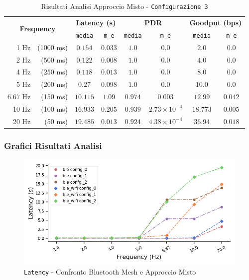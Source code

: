 \begin{table}[hbt!]
    \centering
    \begin{tabular}{ |rr|| c|c|c|c|c|c| } 
        \hline
        \multicolumn{2}{|c||}{\multirow{2}{*}{\textbf{Frequency}}} & \multicolumn{2}{|c|}{\textbf{Latency \scriptsize (s)}} & \multicolumn{2}{|c|}{\textbf{PDR}} & \multicolumn{2}{|c|}{\textbf{Goodput \scriptsize (bps)}} \\
        && \texttt{media} & \texttt{m\_e} & \texttt{media} & \texttt{m\_e} & \texttt{media} & \texttt{m\_e} \\

		\hline
		1 Hz & \scriptsize (1000 ms) & $ 0.154 $ & $ 0.033 $ & $ 1.0 $ & $ 0.0 $ & $ 2.0 $ & $ 0.0 $ \\
		\hline
		2 Hz & \scriptsize (500 ms) & $ 0.122 $ & $ 0.008 $ & $ 1.0 $ & $ 0.0 $ & $ 4.0 $ & $ 0.0 $ \\
		\hline
		4 Hz & \scriptsize (250 ms) & $ 0.118 $ & $ 0.013 $ & $ 1.0 $ & $ 0.0 $ & $ 8.0 $ & $ 0.0 $ \\
		\hline
		5 Hz & \scriptsize (200 ms) & $ 0.27 $ & $ 0.098 $ & $ 1.0 $ & $ 0.0 $ & $ 10.0 $ & $ 0.0 $ \\
		\hline
		6.67 Hz & \scriptsize (150 ms) & $ 10.115 $ & $ 1.09 $ & $ 0.974 $ & $ 0.003 $ & $ 12.99 $ & $ 0.042 $ \\
		\hline
		10 Hz & \scriptsize (100 ms) & $ 16.933 $ & $ 0.205 $ & $ 0.939 $ & $ 2.73 \times 10^{-4} $ & $ 18.773 $ & $ 0.005 $ \\
		\hline
		20 Hz & \scriptsize (50 ms) & $ 19.485 $ & $ 0.013 $ & $ 0.924 $ & $ 4.38 \times 10^{-4} $ & $ 36.94 $ & $ 0.018 $ \\
		\hline
    \end{tabular}
    \caption{Risultati Analisi Approccio Misto - \texttt{Configurazione 3}}
    \label{tab:table_ble_wifi_conf_3}
\end{table}

\subsubsection{Grafici Risultati Analisi}
\label{apex:grafici}
\begin{figure}[hbt!]
    \centering
    \includegraphics[width = 1\textwidth]{images/graphs/mixed_latency.png}
    \caption{\texttt{Latency} - Confronto Bluetooth Mesh e Approccio Misto}
    \label{graph:mixed_latency}
\end{figure}

